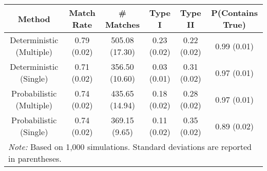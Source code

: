 
\begin{tabular}{cccccc}
\toprule
Method & Match Rate & \# Matches & Type I & Type II & P(Contains True)\\
\midrule
Deterministic (Multiple) & 0.79 (0.02) & 505.08 (17.30) & 0.23 (0.02) & 0.22 (0.02) & 0.99 (0.01)\\
Deterministic (Single) & 0.71 (0.02) & 356.50 (10.60) & 0.03 (0.01) & 0.31 (0.02) & 0.97 (0.01)\\
Probabilistic (Multiple) & 0.74 (0.02) & 435.65 (14.94) & 0.18 (0.02) & 0.28 (0.02) & 0.97 (0.01)\\
Probabilistic (Single) & 0.74 (0.02) & 369.15 (9.65) & 0.11 (0.02) & 0.35 (0.02) & 0.89 (0.02)\\
\bottomrule
\multicolumn{6}{l}{\textit{Note: } Based on 1,000 simulations. Standard deviations are reported in parentheses.}\\
\end{tabular}
